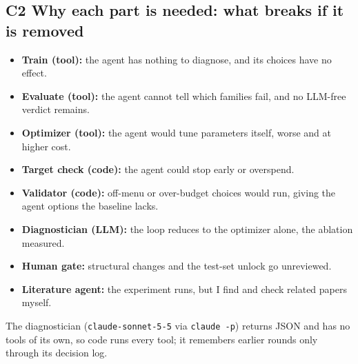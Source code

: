 \documentclass[11pt]{article}
\begin{document}
\subsection*{C2 \quad Why each part is needed: what breaks if it is removed}
\begin{itemize}
\item \textbf{Train (tool):} the agent has nothing to diagnose, and its choices have no effect.
\item \textbf{Evaluate (tool):} the agent cannot tell which families fail, and no LLM-free verdict
  remains.
\item \textbf{Optimizer (tool):} the agent would tune parameters itself, worse and at higher cost.
\item \textbf{Target check (code):} the agent could stop early or overspend.
\item \textbf{Validator (code):} off-menu or over-budget choices would run, giving the agent options
  the baseline lacks.
\item \textbf{Diagnostician (LLM):} the loop reduces to the optimizer alone, the ablation measured.
\item \textbf{Human gate:} structural changes and the test-set unlock go unreviewed.
\item \textbf{Literature agent:} the experiment runs, but I find and check related papers myself.
\end{itemize}

The diagnostician (\texttt{claude-sonnet-5-5} via \texttt{claude -p}) returns JSON and has no tools
of its own, so code runs every tool; it remembers earlier rounds only through its decision log.
\end{document}
